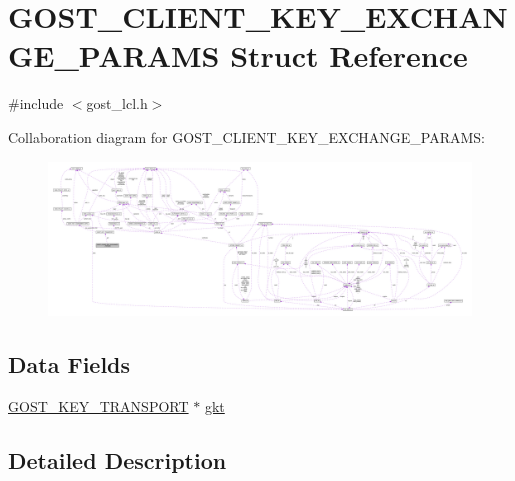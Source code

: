 \hypertarget{struct_g_o_s_t___c_l_i_e_n_t___k_e_y___e_x_c_h_a_n_g_e___p_a_r_a_m_s}{}\section{G\+O\+S\+T\+\_\+\+C\+L\+I\+E\+N\+T\+\_\+\+K\+E\+Y\+\_\+\+E\+X\+C\+H\+A\+N\+G\+E\+\_\+\+P\+A\+R\+A\+MS Struct Reference}
\label{struct_g_o_s_t___c_l_i_e_n_t___k_e_y___e_x_c_h_a_n_g_e___p_a_r_a_m_s}


{\ttfamily \#include $<$gost\+\_\+lcl.\+h$>$}



Collaboration diagram for G\+O\+S\+T\+\_\+\+C\+L\+I\+E\+N\+T\+\_\+\+K\+E\+Y\+\_\+\+E\+X\+C\+H\+A\+N\+G\+E\+\_\+\+P\+A\+R\+A\+MS\+:\nopagebreak
\begin{figure}[H]
\begin{center}
\leavevmode
\includegraphics[width=350pt]{struct_g_o_s_t___c_l_i_e_n_t___k_e_y___e_x_c_h_a_n_g_e___p_a_r_a_m_s__coll__graph}
\end{center}
\end{figure}
\subsection*{Data Fields}
\begin{DoxyCompactItemize}
\item 
\hyperlink{struct_g_o_s_t___k_e_y___t_r_a_n_s_p_o_r_t}{G\+O\+S\+T\+\_\+\+K\+E\+Y\+\_\+\+T\+R\+A\+N\+S\+P\+O\+RT} $\ast$ \hyperlink{struct_g_o_s_t___c_l_i_e_n_t___k_e_y___e_x_c_h_a_n_g_e___p_a_r_a_m_s_ac7bfcc626a7ee8238cf2b8a2953dae50}{gkt}
\end{DoxyCompactItemize}


\subsection{Detailed Description}



